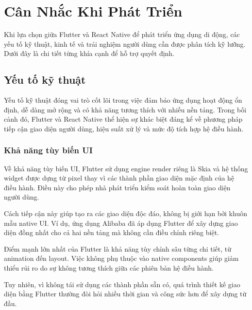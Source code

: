 \section{Cân Nhắc Khi Phát Triển}

\begin{flushleft}
  \hspace*{0.8cm}Khi lựa chọn giữa Flutter và React Native để phát triển ứng dụng di động, các yếu tố kỹ thuật, kinh tế và trải nghiệm người dùng cần được phân tích kỹ lưỡng. Dưới đây là chi tiết từng khía cạnh để hỗ trợ quyết định.
\end{flushleft}

\subsection{Yếu tố kỹ thuật}

\hspace*{1.3em} Yếu tố kỹ thuật đóng vai trò cốt lõi trong việc đảm bảo ứng dụng hoạt động ổn định, dễ dàng mở rộng và có khả năng tương thích với nhiều nền tảng. Trong bối cảnh đó, Flutter và React Native thể hiện sự khác biệt đáng kể về phương pháp tiếp cận giao diện người dùng, hiệu suất xử lý và mức độ tích hợp hệ điều hành.

\subsubsection{Khả năng tùy biến UI}

\hspace*{1.3em} Về khả năng tùy biến UI, Flutter sử dụng engine render riêng là Skia và hệ thống widget được dựng từ pixel thay vì các thành phần giao diện mặc định của hệ điều hành. Điều này cho phép nhà phát triển kiểm soát hoàn toàn giao diện người dùng.

\indent Cách tiếp cận này giúp tạo ra các giao diện độc đáo, không bị giới hạn bởi khuôn mẫu native UI. Ví dụ, ứng dụng Alibaba đã áp dụng Flutter để xây dựng giao diện đồng nhất cho cả hai nền tảng mà không cần điều chỉnh riêng biệt.

\indent Điểm mạnh lớn nhất của Flutter là khả năng tùy chỉnh sâu từng chi tiết, từ animation đến layout. Việc không phụ thuộc vào native components giúp giảm thiểu rủi ro do sự không tương thích giữa các phiên bản hệ điều hành.

\indent Tuy nhiên, vì không tái sử dụng các thành phần sẵn có, quá trình thiết kế giao diện bằng Flutter thường đòi hỏi nhiều thời gian và công sức hơn để xây dựng từ đầu.

